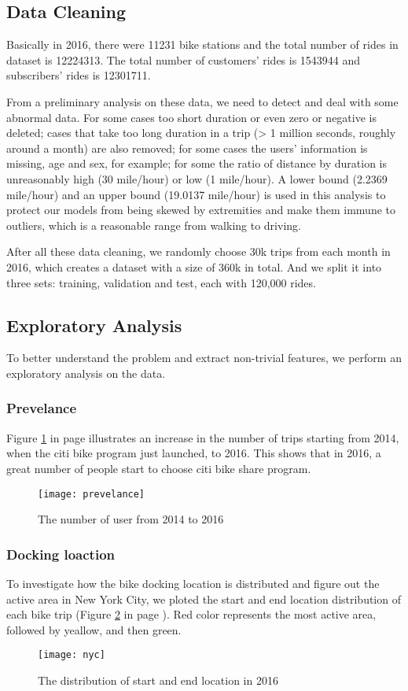 \subsection{Data Cleaning}
	\par Basically in 2016, there were 11231 bike stations and the total number of rides in dataset is 12224313. The total number of customers' rides is 1543944 and subscribers' rides is 12301711. 
	\par From a preliminary analysis on these data, we need to detect and deal with some abnormal data. For some cases too short duration or even zero or negative is deleted; cases that take too long duration in a trip (> 1 million seconds, roughly around a month) are also removed; for some cases the users' information is missing, age and sex, for example; for some the ratio of distance by duration is unreasonably high (30 mile/hour) or low (1 mile/hour). A lower bound (2.2369 mile/hour) and an upper bound (19.0137 mile/hour) is used in this analysis to protect our models from being skewed by extremities and make them immune to outliers, which is a reasonable range from walking to driving\cite{zheng}.
	\par After all these data cleaning, we randomly choose 30k trips from each month in 2016, which creates a dataset with a size of 360k in total. And we split it into three sets: training, validation and test, each with 120,000 rides.
\subsection{Exploratory Analysis}
	\par To better understand the problem and extract non-trivial features, we perform an exploratory analysis on the data. 

	\subsubsection{Prevelance}
	Figure \ref{fig_pre} in page \pageref{fig_pre} illustrates an increase in the number of trips starting from 2014, when the citi bike program just launched, to 2016. This shows that in 2016, a great number of people start to choose citi bike share program.
		  \begin{figure}[h]
		  \centering
		  \texttt{[image: prevelance]}
		  \caption{The number of user from 2014 to 2016}
		  \label{fig_pre}
		  \end{figure}

	\subsubsection{Docking loaction}
	To investigate how the bike docking location is distributed and figure out the active area in New York City, we ploted the start and end location distribution of each bike trip (Figure \ref{fig_nyc} in page \pageref{fig_nyc}). Red color represents the most active area, followed by yeallow, and then green.
		  \begin{figure}[h]
		  \centering
		  \texttt{[image: nyc]}
		  \caption{The distribution of start and end location in 2016}
		  \label{fig_nyc}
		  \end{figure}

